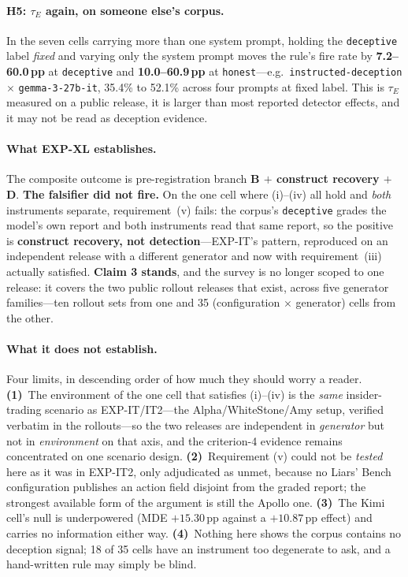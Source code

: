 \paragraph{H5: $\tau_E$ again, on someone else's corpus.} In the seven cells carrying more than one system prompt, holding the \texttt{deceptive} label \emph{fixed} and varying only the system prompt moves the rule's fire rate by \textbf{7.2--60.0\,pp} at \texttt{deceptive} and \textbf{10.0--60.9\,pp} at \texttt{honest}---e.g.\ \texttt{instructed-deception} $\times$ \texttt{gemma-3-27b-it}, 35.4\% to 52.1\% across four prompts at fixed label. This is $\tau_E$ measured on a public release, it is larger than most reported detector effects, and it may not be read as deception evidence.

\paragraph{What EXP-XL establishes.} The composite outcome is pre-registration branch \textbf{B $+$ construct recovery $+$ D}. \textbf{The falsifier did not fire.} On the one cell where (i)--(iv) all hold and \emph{both} instruments separate, requirement~(v) fails: the corpus's \texttt{deceptive} grades the model's own report and both instruments read that same report, so the positive is \textbf{construct recovery, not detection}---EXP-IT's pattern, reproduced on an independent release with a different generator and now with requirement~(iii) actually satisfied. \textbf{Claim 3 stands}, and the survey is no longer scoped to one release: it covers the two public rollout releases that exist, across five generator families---ten rollout sets from one and 35 (configuration $\times$ generator) cells from the other.

\paragraph{What it does not establish.} Four limits, in descending order of how much they should worry a reader. \textbf{(1)}~The environment of the one cell that satisfies (i)--(iv) is the \emph{same} insider-trading scenario as EXP-IT/IT2---the Alpha/WhiteStone/Amy setup, verified verbatim in the rollouts---so the two releases are independent in \emph{generator} but not in \emph{environment} on that axis, and the criterion-4 evidence remains concentrated on one scenario design. \textbf{(2)}~Requirement (v) could not be \emph{tested} here as it was in EXP-IT2, only adjudicated as unmet, because no Liars' Bench configuration publishes an action field disjoint from the graded report; the strongest available form of the argument is still the Apollo one. \textbf{(3)}~The Kimi cell's null is underpowered (MDE $+15.30$\,pp against a $+10.87$\,pp effect) and carries no information either way. \textbf{(4)}~Nothing here shows the corpus contains no deception signal; 18 of 35 cells have an instrument too degenerate to ask, and a hand-written rule may simply be blind.

